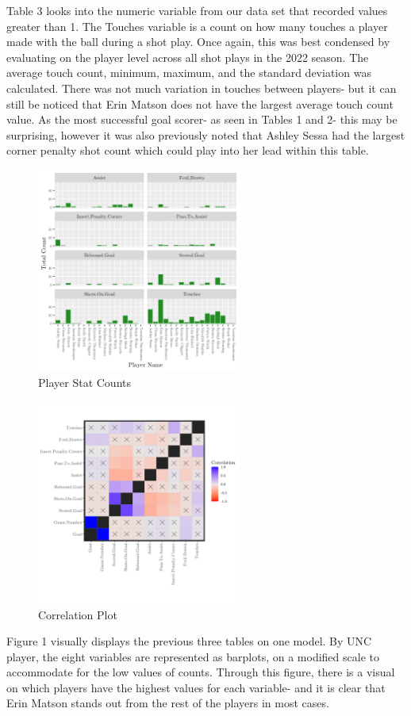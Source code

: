 \documentclass{article} %
\begin{document}
Table 3 looks into the numeric variable from our data set that recorded values greater than 1. The Touches variable is a count on how many touches a player made with the ball during a shot play. Once again, this was best condensed by evaluating on the player level across all shot plays in the 2022 season. The average touch count, minimum, maximum, and the standard deviation was calculated. There was not much variation in touches between players- but it can still be noticed that Erin Matson does not have the largest average touch count value. As the most successful goal scorer- as seen in Tables 1 and 2- this may be surprising, however it was also previously noted that Ashley Sessa had the largest corner penalty shot count which could play into her lead within this table. 
\FloatBarrier
\begin{figure}[H]
	\centering
	\caption{Player Stat Counts}
	\includegraphics[width = 0.6\textwidth]{Barplot}
\end{figure}
\FloatBarrier
\begin{figure}
	\caption{Correlation Plot}
	\includegraphics[width = 0.6\textwidth]{CorrPlot}
\end{figure}
Figure 1 visually displays the previous three tables on one model. By UNC player, the eight variables are represented as barplots, on a modified scale to accommodate for the low values of counts. Through this figure, there is a visual on which players have the highest values for each variable- and it is clear that Erin Matson stands out from the rest of the players in most cases. 
\end{document}
